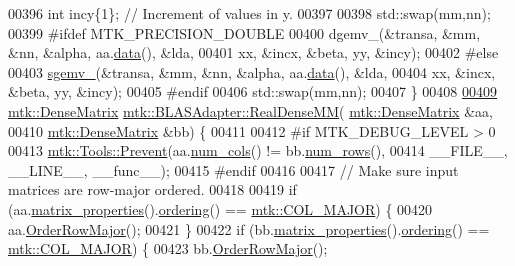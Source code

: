 \begin{DoxyCode}
00396   \textcolor{keywordtype}{int} incy\{1\};                            \textcolor{comment}{// Increment of values in y.}
00397 
00398   std::swap(mm,nn);
00399 \textcolor{preprocessor}{  #ifdef MTK\_PRECISION\_DOUBLE}
00400   dgemv\_(&transa, &mm, &nn, &alpha, aa.\hyperlink{classmtk_1_1DenseMatrix_a16b3ff56feb2658b9fc7147d1de4d8e7}{data}(), &lda,
00401          xx, &incx, &beta, yy, &incy);
00402 \textcolor{preprocessor}{  #else}
00403   \hyperlink{namespacemtk_a88daff7ad6f251a58b94aa2d0c94d069}{sgemv\_}(&transa, &mm, &nn, &alpha, aa.\hyperlink{classmtk_1_1DenseMatrix_a16b3ff56feb2658b9fc7147d1de4d8e7}{data}(), &lda,
00404         xx, &incx, &beta, yy, &incy);
00405 \textcolor{preprocessor}{  #endif}
00406   std::swap(mm,nn);
00407 \}
00408 
\hypertarget{mtk__blas__adapter_8cc_source_l00409}{}\hyperlink{classmtk_1_1BLASAdapter_acebd0e9bfe0bdd609c7fbea98ccfd3b5}{00409} \hyperlink{classmtk_1_1DenseMatrix}{mtk::DenseMatrix} \hyperlink{classmtk_1_1BLASAdapter_acebd0e9bfe0bdd609c7fbea98ccfd3b5}{mtk::BLASAdapter::RealDenseMM}(
      \hyperlink{classmtk_1_1DenseMatrix}{mtk::DenseMatrix} &aa,
00410                                                \hyperlink{classmtk_1_1DenseMatrix}{mtk::DenseMatrix} &bb) \{
00411 
00412 \textcolor{preprocessor}{  #if MTK\_DEBUG\_LEVEL > 0}
00413   \hyperlink{classmtk_1_1Tools_afe5bb096309258e2e72503fd7b41c7e0}{mtk::Tools::Prevent}(aa.\hyperlink{classmtk_1_1DenseMatrix_af6f78373aaf2136f0c78974d7c8de0a8}{num\_cols}() != bb.\hyperlink{classmtk_1_1DenseMatrix_a17d8d3b9cc0926044b6972dd190a5c21}{num\_rows}(),
00414                       \_\_FILE\_\_, \_\_LINE\_\_, \_\_func\_\_);
00415 \textcolor{preprocessor}{  #endif}
00416 
00417   \textcolor{comment}{// Make sure input matrices are row-major ordered.}
00418 
00419   \textcolor{keywordflow}{if} (aa.\hyperlink{classmtk_1_1DenseMatrix_abb5e4db5688743c6f9fd9ec6e38ed4ca}{matrix\_properties}().\hyperlink{classmtk_1_1Matrix_af675e480c7b94f194aadad316e53b002}{ordering}() == 
      \hyperlink{namespacemtk_ga622801bd9f912d0f976c3e383f5f581ca7c11989c132253fb76b8f6b1314f7e13}{mtk::COL\_MAJOR}) \{
00420     aa.\hyperlink{classmtk_1_1DenseMatrix_ac2949efba3e8278335d45418c85433e4}{OrderRowMajor}();
00421   \}
00422   \textcolor{keywordflow}{if} (bb.\hyperlink{classmtk_1_1DenseMatrix_abb5e4db5688743c6f9fd9ec6e38ed4ca}{matrix\_properties}().\hyperlink{classmtk_1_1Matrix_af675e480c7b94f194aadad316e53b002}{ordering}() == 
      \hyperlink{namespacemtk_ga622801bd9f912d0f976c3e383f5f581ca7c11989c132253fb76b8f6b1314f7e13}{mtk::COL\_MAJOR}) \{
00423     bb.\hyperlink{classmtk_1_1DenseMatrix_ac2949efba3e8278335d45418c85433e4}{OrderRowMajor}();

\end{DoxyCode}
